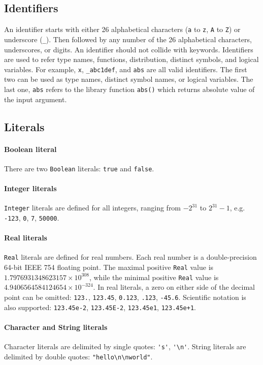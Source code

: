 \documentclass[12pt]{article}
\begin{document}
\subsection{Identifiers}\label{identifier-section}
An identifier starts with either 26 alphabetical characters (\verb|a| to \verb|z|, \verb|A| to \verb|Z|) or underscore (\verb|_|). Then followed by any number of the 26 alphabetical characters, underscores, or digits. 
An identifier should not collide with keywords. 
Identifiers are used to refer type names, functions, distribution, distinct symbols, and logical variables. 
For example, \verb|x|, \verb|_abc1def|, and \verb|abs| are all valid identifiers. 
The first two can be used as type names, distinct symbol names, or logical variables. 
The last one, \verb|abs| refers to the library function \verb|abs()| which returns absolute value of the input argument.

\subsection{Literals}
\paragraph{Boolean literal}

There are two \verb|Boolean| literals: \verb|true| and \verb|false|. 

\paragraph{Integer literals}
\verb|Integer| literals are defined for all integers, ranging from $-2^{31}$ to $2^{31}-1$, e.g. \verb|-123|, \verb|0|,
\verb|7|, \verb|50000|.

\paragraph{Real literals}
\verb|Real| literals are defined for real numbers. Each real number is a double-precision 64-bit IEEE 754 floating point. The maximal positive \verb|Real| value is $1.7976931348623157 × 10^{308}$, while the minimal positive \verb|Real| value is $4.9406564584124654 × 10^{−324}$. 
In real literals, a zero on either side of the decimal point can be omitted: \verb|123.|, \verb|123.45|, \verb|0.123|,
\verb|.123|, \verb|-45.6|. Scientific notation is also supported:
\verb|123.45e-2|, \verb|123.45E-2|, \verb|123.45e1|, \verb|123.45e+1|.


\paragraph{Character and String literals}
Character literals are delimited by single quotes: \verb|'s'|, \verb|'\n'|.
String literals are delimited by double quotes: \verb|"hello\n\nworld"|.
\end{document}
